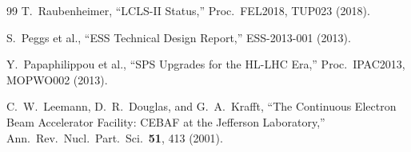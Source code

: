 \documentclass[aps,prd,twocolumn,superscriptaddress,floatfix,nofootinbib]{revtex4-2}
\begin{document}
\begin{thebibliography}{99}
T.~Raubenheimer, ``LCLS-II Status,'' Proc.\ FEL2018, TUP023 (2018).

S.~Peggs et al., ``ESS Technical Design Report,''
ESS-2013-001 (2013).

Y.~Papaphilippou et al., ``SPS Upgrades for the HL-LHC Era,''
Proc.\ IPAC2013, MOPWO002 (2013).

C.~W.~Leemann, D.~R.~Douglas, and G.~A.~Krafft, ``The Continuous
Electron Beam Accelerator Facility: CEBAF at the Jefferson Laboratory,''
Ann.\ Rev.\ Nucl.\ Part.\ Sci.\ \textbf{51}, 413 (2001).

\end{thebibliography}
\end{document}
